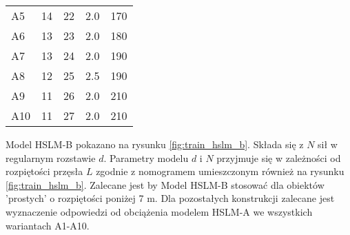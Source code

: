 \begin{table}[hbt!]
\begin{tabular}{@{} P{0.1\textwidth} *4{P{0.225\textwidth}} @{}}
		A5   & 14                                                                                      & 22                                                                                    & 2.0                                                                         & 170                                                                   \\ %
		A6   & 13                                                                                      & 23                                                                                    & 2.0                                                                         & 180                                                                   \\ %
		A7   & 13                                                                                      & 24                                                                                    & 2.0                                                                         & 190                                                                   \\ %
		A8   & 12                                                                                      & 25                                                                                    & 2.5                                                                         & 190                                                                   \\ %
		A9   & 11                                                                                      & 26                                                                                    & 2.0                                                                         & 210                                                                   \\ %
		A10  & 11                                                                                      & 27                                                                                    & 2.0                                                                         & 210                                                                   \\ \bottomrule
	\end{tabular}
	\label{tab:hslm_a_parameters}
\end{table}

Model HSLM-B pokazano na rysunku \ref{fig:train_hslm_b}. Składa się z $N$ sił w regularnym rozstawie $d$. Parametry modelu $d$ i $N$ przyjmuje się w zależności od rozpiętości przęsła $L$ zgodnie z nomogramem umieszczonym również na rysunku \ref{fig:train_hslm_b}. Zalecane jest by Model HSLM-B stosować dla obiektów 'prostych' o rozpiętości poniżej 7 m. Dla pozostałych konstrukcji zalecane jest wyznaczenie odpowiedzi od obciążenia modelem HSLM-A we wszystkich wariantach A1-A10.


